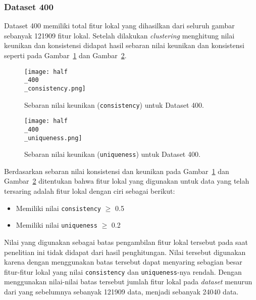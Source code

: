 \subsubsection{Dataset 400}
Dataset 400 memiliki total fitur lokal yang dihasilkan dari seluruh gambar sebanyak 121909 fitur lokal. Setelah dilakukan \textit{clustering} menghitung nilai keunikan dan konsistensi didapat hasil sebaran nilai keunikan dan konsistensi seperti pada Gambar~\ref{fig:half_400_consistency} dan Gambar~\ref{fig:half_400_uniqueness}.
\begin{figure}[H]
	\centering
	\texttt{[image: half\\\_400\\\_consistency.png]}
	\caption{Sebaran nilai keunikan (\texttt{consistency}) untuk Dataset 400.}
	\label{fig:half_400_consistency}
\end{figure}
\begin{figure}[H]
	\centering
	\texttt{[image: half\\\_400\\\_uniqueness.png]}
	\caption{Sebaran nilai keunikan (\texttt{uniqueness}) untuk Dataset 400.}
	\label{fig:half_400_uniqueness}
\end{figure}
Berdasarkan sebaran nilai konsistensi dan keunikan pada Gambar~\ref{fig:half_400_consistency} dan Gambar~\ref{fig:half_400_uniqueness} ditentukan bahwa fitur lokal yang digunakan untuk data yang telah tersaring adalah fitur lokal dengan ciri sebagai berikut:
\begin{itemize}
	\item Memiliki nilai \texttt{consistency} $\geq$ 0.5
	\item Memiliki nilai \texttt{uniqueness} $\geq$ 0.2
\end{itemize}
Nilai yang digunakan sebagai batas pengambilan fitur lokal tersebut pada saat penelitian ini tidak didapat dari hasil penghitungan. Nilai tersebut digunakan karena dengan menggunakan batas tersebut dapat menyaring sebagian besar fitur-fitur lokal yang nilai \texttt{consistency} dan \texttt{uniqueness}-nya rendah. Dengan menggunakan nilai-nilai batas tersebut jumlah fitur lokal pada \textit{dataset} menurun dari yang sebelumnya sebanyak 121909 data, menjadi sebanyak 24040 data.


